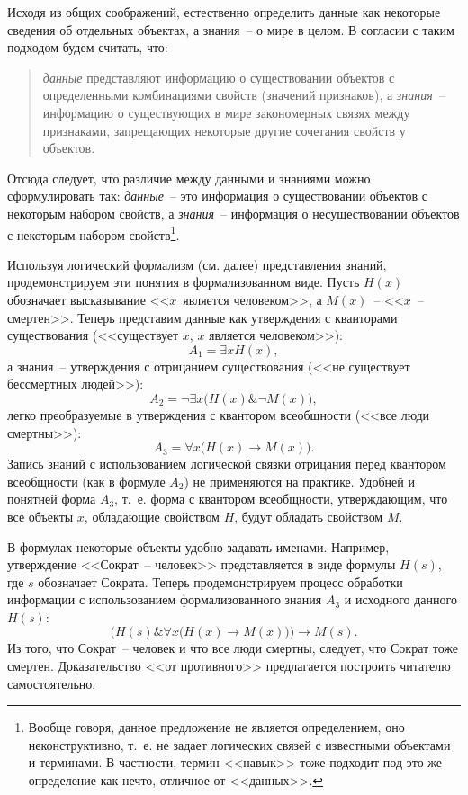 \documentclass[a4paper,14pt, openany, twoside, draft]{extbook} %
\begin{document}
Исходя из общих соображений, естественно определить данные как некоторые сведения об отдельных объектах, а знания~-- о мире в целом. В согласии с таким подходом будем считать, что:
\begin{quote}
{\em данные} представляют информацию о существовании объектов с определенными комбинациями свойств (значений признаков), а {\em знания}~-- информацию о существующих в мире закономерных связях между признаками, запрещающих некоторые другие сочетания свойств у объектов.
\end{quote}

Отсюда следует, что различие между данными и знаниями можно сформулировать так: {\em данные}~-- это информация о существовании объектов с некоторым набором свойств, а {\em знания}~-- информация о несуществовании объектов с некоторым набором свойств\footnote{Вообще говоря, данное предложение не является определением, оно неконструктивно, т.~е. не задает логических связей с известными объектами и терминами. В частности, термин <<навык>> тоже подходит под это же определение как нечто, отличное от <<данных>>.}.

Используя логический формализм (см. далее) представления знаний, продемонстрируем эти понятия в формализованном виде.  Пусть $H(x)$ обозначает высказывание <<$x$~является человеком>>, а $M(x)$~-- <<$x$~-- смертен>>. Теперь представим данные как утверждения с кванторами существования (<<существует $x$, $x$ является человеком>>):
$$
    A_1=\exists x H(x),
$$
а знания~-- утверждения с отрицанием существования (<<не существует бессмертных людей>>):
$$
    A_2=\neg\exists x \big ( H(x) \& \neg M(x) \big ),
$$
легко преобразуемые в утверждения с квантором всеобщности (<<все люди смертны>>):
$$
    A_3=\forall x \big ( H(x)\to M(x)\big ).
$$
Запись знаний с использованием логической связки отрицания перед квантором всеобщности (как в формуле $A_2$) не применяются на практике. Удобней и понятней форма $A_3$, т.~е. форма с квантором всеобщности, утверждающим, что все объекты $x$, обладающие свойством $H$, будут обладать свойством $M$.

В формулах некоторые объекты удобно задавать именами.  Например, утверждение <<Сократ~-- человек>> представляется в виде формулы $H(s)$, где $s$ обозначает Сократа.  Теперь продемонстрируем процесс обработки информации с использованием формализованного знания $A_3$ и исходного данного $H(s)$:
$$
\Big (H(s) \& \forall x \big ( H(x)\to M(x)\big ) \Big ) \to M(s).
$$
Из того, что Сократ~-- человек и что все люди смертны, следует, что Сократ тоже смертен.  Доказательство <<от противного>> предлагается построить читателю самостоятельно.
\end{document}
